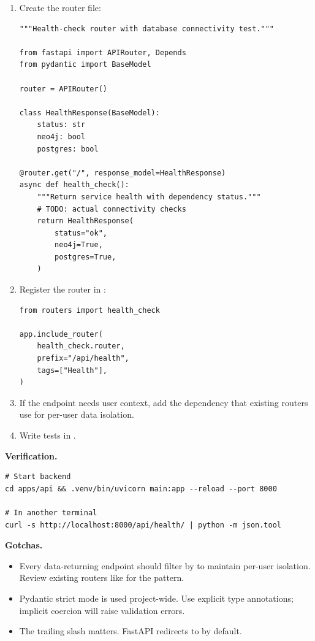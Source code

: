 \begin{enumerate}
    \item Create the router file:

\begin{lstlisting}[style=python, title=routers/health\_check.py]
"""Health-check router with database connectivity test."""

from fastapi import APIRouter, Depends
from pydantic import BaseModel

router = APIRouter()

class HealthResponse(BaseModel):
    status: str
    neo4j: bool
    postgres: bool

@router.get("/", response_model=HealthResponse)
async def health_check():
    """Return service health with dependency status."""
    # TODO: actual connectivity checks
    return HealthResponse(
        status="ok",
        neo4j=True,
        postgres=True,
    )
\end{lstlisting}

    \item Register the router in :

\begin{lstlisting}[style=python]
from routers import health_check

app.include_router(
    health_check.router,
    prefix="/api/health",
    tags=["Health"],
)
\end{lstlisting}

    \item If the endpoint needs user context, add the 
          dependency that existing routers use for per-user data isolation.

    \item Write tests in .
\end{enumerate}

\medskip\noindent\textbf{Verification.}

\begin{lstlisting}[style=bash, numbers=none]
# Start backend
cd apps/api && .venv/bin/uvicorn main:app --reload --port 8000

# In another terminal
curl -s http://localhost:8000/api/health/ | python -m json.tool
\end{lstlisting}

\medskip\noindent\textbf{Gotchas.}

\begin{itemize}
    \item Every data-returning endpoint should filter by  to
          maintain per-user isolation.  Review existing routers like
           for the pattern.
    \item Pydantic strict mode is used project-wide.  Use explicit type
          annotations; implicit coercion will raise validation errors.
    \item The trailing slash matters.  FastAPI redirects 
          to  by default.
\end{itemize}


